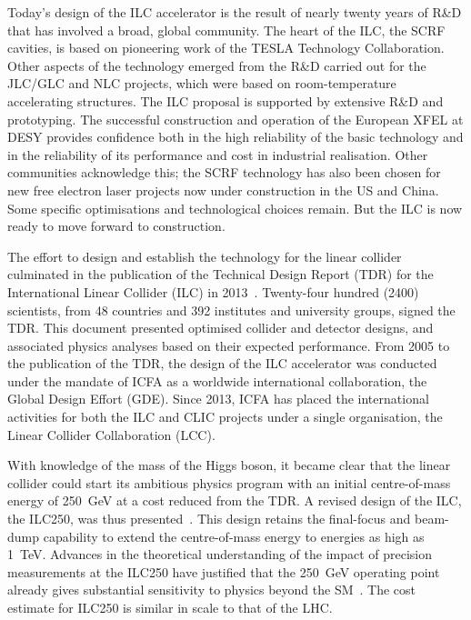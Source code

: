 Today's design of the ILC accelerator is the result of 
nearly twenty years of
R\&D that has involved a broad, global community. 
The heart of the ILC, the SCRF cavities, is based on
pioneering work of the TESLA Technology Collaboration. Other aspects of the 
technology
emerged from the R\&D carried out for the JLC/GLC and NLC projects,
which were based on room-temperature accelerating structures. 
The ILC proposal
is supported by extensive R\&D and prototyping. The successful construction and
operation 
of the European XFEL at DESY provides
confidence both in the high reliability of the basic
technology and in the reliability of its performance and cost in 
industrial realisation.  Other communities acknowledge this; the SCRF 
 technology has also been chosen for new
free electron laser projects now under construction in the US and China.
Some specific optimisations and technological choices remain.
But the ILC is now ready to move forward to construction. 

The effort to design and
establish the technology for the linear collider culminated in the
publication of the Technical Design Report (TDR) for the International
Linear Collider (ILC) in 2013~\cite{Behnke:2013xla}. 
Twenty-four hundred (2400) scientists, from 48 countries and 
392 institutes and university
groups,
 signed the TDR.  This document
presented optimised collider and detector designs, and associated 
physics analyses based on their  expected performance.
From
2005 to the publication of the TDR, the
design of the ILC accelerator was conducted under the mandate of ICFA
as a worldwide
international collaboration, the Global Design Effort (GDE). 
Since 2013, ICFA has placed the  international activities for both the ILC and CLIC
projects under a single organisation, 
the Linear Collider Collaboration (LCC).


With knowledge of the mass of the Higgs boson, it became clear that
the 
linear collider could start its ambitious physics program
 with an initial centre-of-mass energy of 250~GeV at a cost
reduced from the TDR. A revised design of the ILC, the ILC250, was
thus  presented~\cite{Evans:2017rvt}.  This design  retains the final-focus and
beam-dump capability to extend the centre-of-mass energy to energies
as high as 1~TeV. Advances in the theoretical understanding of the impact of precision
measurements at the 
 ILC250 have justified that the 250~GeV operating point already gives
 substantial 
sensitivity to physics beyond the SM~\cite{Barklow:2017suo,Fujii:2017vwa}. 
 The cost estimate for ILC250 
  is similar in scale to that of the LHC.


